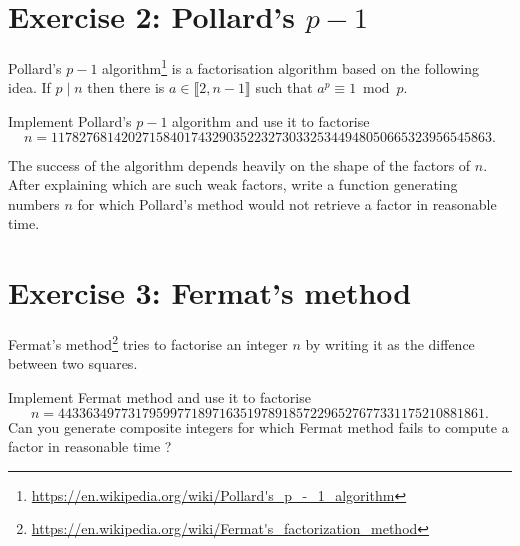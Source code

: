 \documentclass[english,a4paper,11pt]{exam}
\begin{document}
\section*{Exercise 2: Pollard's \(p-1\)}

Pollard's \(p-1\) algorithm\footnote{\url{https://en.wikipedia.org/wiki/Pollard's_p_-_1_algorithm}} is a factorisation algorithm based on
the following idea. If \(p \mid n\) then there is
\(a \in \llbracket 2, n-1 \rrbracket\) such that \(a^{p} \equiv 1 \bmod p\).

\begin{questions}
  
  \question Implement Pollard's \(p-1\) algorithm and use it to factorise
  \[
    n = 117827681420271584017432903522327303325344948050665323956545863.
  \]
  
  \question The success of the algorithm depends heavily on the shape of
  the factors of \(n\). After explaining which are such weak factors, write a function
  generating numbers \(n\) for which Pollard's method would not retrieve a factor in
  reasonable time.
\end{questions}

\section*{Exercise 3: Fermat's method}

Fermat's method\footnote{\url{https://en.wikipedia.org/wiki/Fermat's_factorization_method}} tries to factorise an integer \(n\) by writing it as the diffence between
two squares.
\begin{questions}
  \question Implement Fermat method and use it to factorise
  \[
    n = 4433634977317959977189716351978918572296527677331175210881861.
  \]
  \question Can you generate composite integers for which Fermat method fails to
  compute a factor in reasonable time ?
\end{questions}
\end{document}
